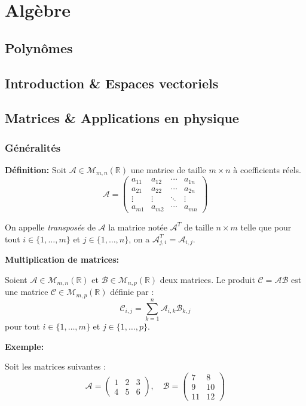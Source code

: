 \section{Algèbre}
\subsection{Polynômes}
\subsection{Introduction \& Espaces vectoriels}
\subsection{Matrices \& Applications en physique}

\subsubsection{Généralités}
\textbf{Définition:}
Soit $\mathcal{A}  \in \mathcal{M}_{m,n}(\mathbb{R})$ une matrice de taille $m \times n$ à coefficients réels. 
\[
\mathcal{A}  = \begin{pmatrix}
a_{11} & a_{12} & \cdots & a_{1n} \\
a_{21} & a_{22} & \cdots & a_{2n} \\
\vdots & \vdots & \ddots & \vdots \\
a_{m1} & a_{m2} & \cdots & a_{mn}
\end{pmatrix}
\]

On appelle \textit{transposée} de $\mathcal{A}$ la matrice notée $\mathcal{A}^T$ de taille $n \times m$ telle que pour tout $i \in \{1, \ldots, m\}$ et $j \in \{1, \ldots, n\}$, on a $\mathcal{A}^T_{j,i} = \mathcal{A}_{i,j}$.


\textbf{Multiplication de matrices:}

Soient $\mathcal{A} \in \mathcal{M}_{m,n}(\mathbb{R})$ et $\mathcal{B} \in \mathcal{M}_{n,p}(\mathbb{R})$ deux matrices. Le produit $\mathcal{C} = \mathcal{A} \mathcal{B}$ est une matrice $\mathcal{C} \in \mathcal{M}_{m,p}(\mathbb{R})$ définie par :
\[
\mathcal{C}_{i,j} = \sum_{k=1}^{n} \mathcal{A}_{i,k} \mathcal{B}_{k,j}
\]
pour tout $i \in \{1, \ldots, m\}$ et $j \in \{1, \ldots, p\}$.

\textbf{Exemple:}

Soit les matrices suivantes :
\[
\mathcal{A} = \begin{pmatrix}
1 & 2 & 3 \\
4 & 5 & 6
\end{pmatrix}, \quad
\mathcal{B} = \begin{pmatrix}
7 & 8 \\
9 & 10 \\
11 & 12
\end{pmatrix}
\]

